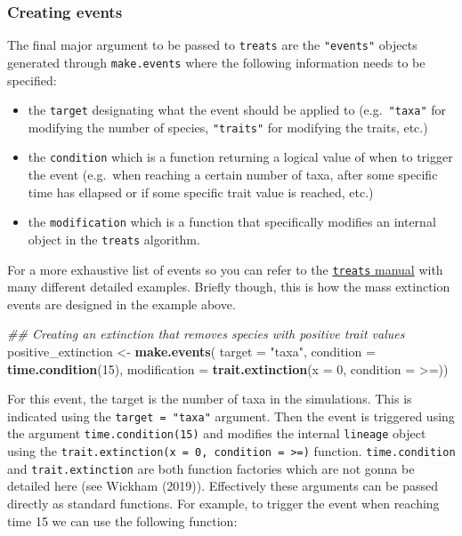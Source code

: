\documentclass[
]{article}
\newenvironment{Shaded}{\begin{snugshade}}{\end{snugshade}}
\newcommand{\CommentTok}[1]{\textcolor[rgb]{0.56,0.35,0.01}{\textit{#1}}}
\newcommand{\DataTypeTok}[1]{\textcolor[rgb]{0.13,0.29,0.53}{#1}}
\newcommand{\DecValTok}[1]{\textcolor[rgb]{0.00,0.00,0.81}{#1}}
\newcommand{\KeywordTok}[1]{\textcolor[rgb]{0.13,0.29,0.53}{\textbf{#1}}}
\newcommand{\NormalTok}[1]{#1}
\newcommand{\StringTok}[1]{\textcolor[rgb]{0.31,0.60,0.02}{#1}}
\providecommand{\tightlist}{%
  \setlength{\itemsep}{0pt}\setlength{\parskip}{0pt}}
\begin{document}
\hypertarget{creating-events}{%
\subsubsection{Creating events}\label{creating-events}}

The final major argument to be passed to \texttt{treats} are the
\texttt{"events"} objects generated through \texttt{make.events} where
the following information needs to be specified:

\begin{itemize}
\tightlist
\item
  the \texttt{target} designating what the event should be applied to
  (e.g.~\texttt{"taxa"} for modifying the number of species,
  \texttt{"traits"} for modifying the traits, etc.)
\item
  the \texttt{condition} which is a function returning a logical value
  of when to trigger the event (e.g.~when reaching a certain number of
  taxa, after some specific time has ellapsed or if some specific trait
  value is reached, etc.)
\item
  the \texttt{modification} which is a function that specifically
  modifies an internal object in the \texttt{treats} algorithm.
\end{itemize}

For a more exhaustive list of events so you can refer to the
\href{http://tguillerme.github.io/treats.html}{\texttt{treats} manual}
with many different detailed examples. Briefly though, this is how the
mass extinction events are designed in the example above.

\begin{Shaded}
\begin{Highlighting}[]
\CommentTok{\#\# Creating an extinction that removes species with positive trait values}
\NormalTok{positive\_extinction \textless{}{-}}\StringTok{ }\KeywordTok{make.events}\NormalTok{(}
    \DataTypeTok{target       =} \StringTok{"taxa"}\NormalTok{,}
    \DataTypeTok{condition    =} \KeywordTok{time.condition}\NormalTok{(}\DecValTok{15}\NormalTok{),}
    \DataTypeTok{modification =} \KeywordTok{trait.extinction}\NormalTok{(}\DataTypeTok{x =} \DecValTok{0}\NormalTok{, }\DataTypeTok{condition =} \StringTok{\textasciigrave{}}\DataTypeTok{\textgreater{}=}\StringTok{\textasciigrave{}}\NormalTok{))}
\end{Highlighting}
\end{Shaded}

For this event, the target is the number of taxa in the simulations.
This is indicated using the \texttt{target\ =\ "taxa"} argument. Then
the event is triggered using the argument \texttt{time.condition(15)}
and modifies the internal \texttt{lineage} object using the
\texttt{trait.extinction(x\ =\ 0,\ condition\ =\ \textasciigrave{}\textgreater{}=\textasciigrave{})}
function. \texttt{time.condition} and \texttt{trait.extinction} are both
function factories which are not gonna be detailed here (see Wickham
(2019)). Effectively these arguments can be passed directly as standard
functions. For example, to trigger the event when reaching time 15 we
can use the following function:
\end{document}
